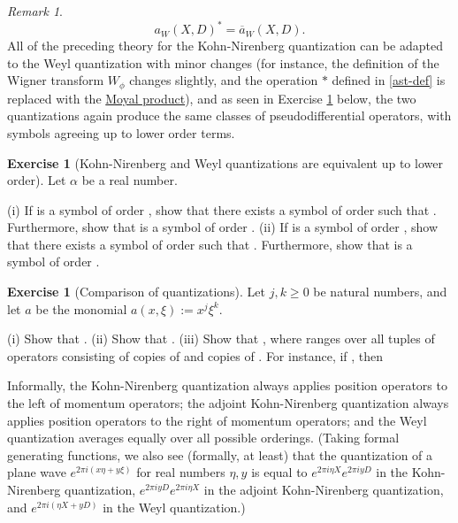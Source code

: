 \documentclass[11pt]{article}
\theoremstyle{definition}
\newtheorem{exercise}[theorem]{Exercise}
\theoremstyle{remark}
\newtheorem{remark}[theorem]{Remark}
\begin{document}
\begin{remark}
\[\displaystyle  a_W(X,D)^* = \overline{a}_W(X,D).\]
 All of the preceding theory for the Kohn-Nirenberg quantization can be adapted to the Weyl quantization with minor changes (for instance, the definition of the Wigner transform \({W_\phi}\) changes slightly, and the operation \({\ast}\) defined in \eqref{ast-def} is replaced with the \href{https://en.wikipedia.org/wiki/Moyal_product}{Moyal product}), and as seen in Exercise \ref{knw} below, the two quantizations again produce the same classes of pseudodifferential operators, with symbols agreeing up to lower order terms. 

\end{remark}
\begin{exercise}[Kohn-Nirenberg and Weyl quantizations are equivalent up to lower order]
 \label{knw} Let \({\alpha}\) be a real number. 


(i) If  is a symbol of order , show that there exists a symbol  of order  such that . Furthermore, show that  is a symbol of order . 
(ii) If  is a symbol of order , show that there exists a symbol  of order  such that . Furthermore, show that  is a symbol of order .



\end{exercise}
\begin{exercise}[Comparison of quantizations]
  Let \({j,k \geq 0}\) be natural numbers, and let \({a}\) be the monomial \({a(x,\xi) := x^j \xi^k}\). 


(i) Show that . 
(ii) Show that . 
(iii) Show that , where  ranges over all tuples of operators consisting of  copies of  and  copies of . For instance, if , then



 Informally, the Kohn-Nirenberg quantization always applies position operators to the left of momentum operators; the adjoint Kohn-Nirenberg quantization always applies position operators to the right of momentum operators; and the Weyl quantization averages equally over all possible orderings. (Taking formal generating functions, we also see (formally, at least) that the quantization of a plane wave \({e^{2\pi i (x \eta + y \xi)}}\) for real numbers \({\eta,y}\) is equal to \({e^{2\pi i \eta X} e^{2\pi i y D}}\) in the Kohn-Nirenberg quantization, \({e^{2\pi i yD} e^{2\pi i \eta X}}\) in the adjoint Kohn-Nirenberg quantization, and \({e^{2\pi i(\eta X + yD)}}\) in the Weyl quantization.) 

\end{exercise}
\end{document}
